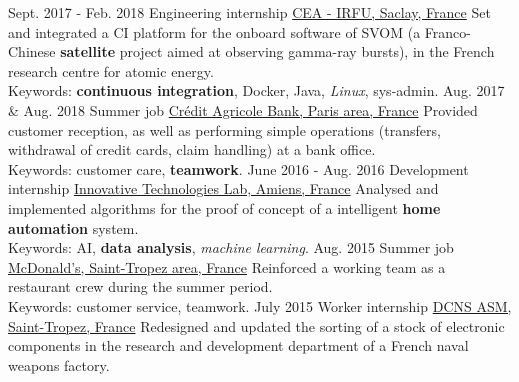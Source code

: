 \documentclass[a4paper]{twentysecondcv} %
\begin{document}
\begin{twenty} %
    \twentyitem
    	{Sept. 2017 -}
		{Feb. 2018}
        {Engineering internship}
        {\href{http://irfu.cea.fr/}{CEA - IRFU, Saclay, France}}
        {}
        {Set and integrated a CI platform for the onboard software of SVOM (a Franco-Chinese \textbf{satellite} project aimed at observing gamma-ray bursts), in the French research centre for atomic energy.\\Keywords: \textbf{continuous integration}, Docker, Java, \textit{Linux}, sys-admin.}
    \twentyitem
        {Aug. 2017 \&}
                {Aug. 2018}
        {Summer job}
        {\href{https://ca-paris.com/}{Crédit Agricole Bank, Paris area, France}}
        {}
        {Provided customer reception, as well as performing simple operations (transfers, withdrawal of credit cards, claim handling) at a bank office.\\Keywords: customer care, \textbf{teamwork}.}
	\twentyitem
    	{June 2016 -}
		{Aug. 2016}
        {Development internship}
        {\href{http://lti-picardie.fr/}{Innovative Technologies Lab, Amiens, France}}
        {}
        {Analysed and implemented algorithms for the proof of concept of a intelligent \textbf{home automation} system.\\Keywords: AI, \textbf{data analysis}, \textit{machine learning}.}
    \twentyitem
   		{Aug. 2015}
        {}
        {Summer job}
        {\href{https://www.restaurants.mcdonalds.fr/mcdonalds-gassin}{McDonald's, Saint-Tropez area, France}}
        {}
        {Reinforced a working team as a restaurant crew during the summer period.\\Keywords: customer service, teamwork.}
     \twentyitem
   		{July 2015}
		{}
        {Worker internship}
        {\href{https://www.naval-group.com/fr/}{DCNS ASM, Saint-Tropez, France}}
        {}
        {Redesigned and updated the sorting of a stock of electronic components in the research and development department of a French naval weapons factory.}
\end{twenty}

\end{document}
